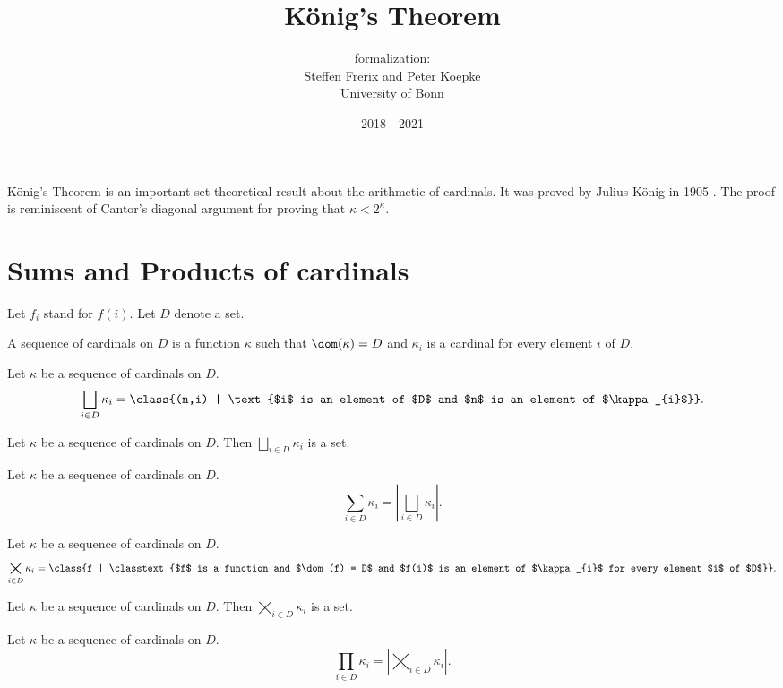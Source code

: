\documentclass{article}
\title{König's Theorem}
\author{\Naproche formalization:\\[0.5em]
Steffen Frerix and Peter Koepke \\
University of Bonn}
\date{2018 - 2021}
\newcommand{\SumSet}[2]{\bigsqcup_{i \in #2} #1_{i}}
\newcommand{\Sum}[2]{\sum_{i \in #2} #1_{i}}
\newcommand{\ProdSet}[2]{\bigtimes_{i \in #2} #1_{i}}
\newcommand{\Prod}[2]{\prod_{i \in #2} #1_{i}}
\begin{document}
\maketitle


\noindent König's Theorem is an important set-theoretical result about the
arithmetic of cardinals.
It was proved by Julius König in 1905 \cite[p. 177--180]{Koenig1905}.
The proof is reminiscent of Cantor's diagonal argument for proving that
$\kappa < 2^\kappa$.


\section*{Sums and Products of cardinals}

\begin{forthel}
  Let $f_{i}$ stand for $f(i)$.
  Let $D$ denote a set.

  \begin{definition*}
    A sequence of cardinals on $D$ is a function $\kappa$ such that
    $\dom(\kappa) = D$ and $\kappa_{i}$ is a cardinal for every element $i$ of $D$.
  \end{definition*}

  \begin{definition*}
    Let $\kappa$ be a sequence of cardinals on $D$.
    \[ \SumSet{\kappa}{D} = \class{(n,i) | \text{$i$ is an element of $D$ and $n$ is an element of $\kappa_{i}$}}. \]
  \end{definition*}

  \begin{axiom*}
    Let $\kappa$ be a sequence of cardinals on $D$.
    Then $\SumSet{\kappa}{D}$ is a set.
  \end{axiom*}

  \begin{definition*}
    Let $\kappa$ be a sequence of cardinals on $D$.
    \[ \Sum{\kappa}{D} = \left| \SumSet{\kappa}{D} \right|. \]
  \end{definition*}

  \begin{definition*}
    Let $\kappa$ be a sequence of cardinals on $D$.
    \[ \ProdSet{\kappa}{D} = \class{f | \classtext{$f$ is a function and $\dom(f) = D$ and $f(i)$ is an element of $\kappa_{i}$ for every element $i$ of $D$}}. \]
  \end{definition*}

  \begin{axiom*}
    Let $\kappa$ be a sequence of cardinals on $D$.
    Then $\ProdSet{\kappa}{D}$ is a set.
  \end{axiom*}

  \begin{definition*}
    Let $\kappa$ be a sequence of cardinals on $D$.
    \[ \Prod{\kappa}{D} = \left| \ProdSet{\kappa}{D} \right|. \]
  \end{definition*}
\end{forthel}
\end{document}
